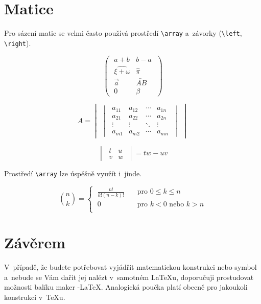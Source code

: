 \documentclass[a4paper,11pt,twocolumn]{article}
\theoremstyle{definition}
\begin{document}
\section{Matice}

Pro sázení matic se velmi často používá prostředí \verb|\array| a~závorky (\verb|\left|, \verb|\right|). 

$$
\begin{pmatrix}
  \; {a+b} & {b-a} \; \\
  \; {\widehat{\xi+\omega}} & \hat{\pi} \; \\
  \; \vec{a} & \overleftrightarrow{AB} \; \\
  \; 0 & \beta \;
\end{pmatrix}
$$

$$A = 
\begin{vmatrix}\!
\begin{vmatrix}
  \; a_{11} & a_{12} & \cdots & a_{1n} \; \\
  \; a_{21} & a_{22} & \cdots & a_{2n} \; \\
  \; \vdots  & \vdots  & \ddots & \vdots \; \\
  \; a_{m1} & a_{m2} & \cdots & a_{mn} \;
\end{vmatrix}\!
\end{vmatrix}$$

$$
\begin{vmatrix}
\; t & u \; \\ \; v & w \; 
\end{vmatrix} = tw - uv
$$

Prostředí \verb|\array| lze úspěšně využít i~jinde.

$$\binom{n}{k} = 
\begin{cases}
     \; \frac{n!}{k!(n-k)!} & \quad \text{pro } 0 \leq k \leq n\\
     \; 0 & \quad \text{pro } k < 0 \text{ nebo } k > n\\
\end{cases}$$

\section{Závěrem}

V~případě, že budete potřebovat vyjádřit matematickou konstrukci nebo symbol a~nebude se Vám dařit jej nalézt v~samotném \LaTeX u, doporučuji prostudovat možnosti balíku maker \AmS-\LaTeX.
Analogická poučka platí obecně pro jakoukoli konstrukci v~\TeX u.
\end{document}
